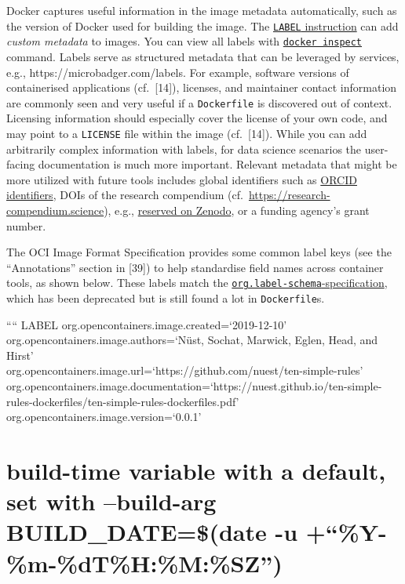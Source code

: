 \documentclass[10pt,letterpaper]{article}
\begin{document}
Docker captures useful information in the image metadata automatically,
such as the version of Docker used for building the image. The
\href{https://docs.docker.com/engine/reference/builder/\#label}{\texttt{LABEL}
instruction} can add \emph{custom metadata} to images. You can view all
labels with
\href{https://docs.docker.com/engine/reference/commandline/inspect/}{\texttt{docker\ inspect}}
command. Labels serve as structured metadata that can be leveraged by
services, e.g., https://microbadger.com/labels. For example, software
versions of containerised applications (cf.~{[}14{]}), licenses, and
maintainer contact information are commonly seen and very useful if a
\texttt{Dockerfile} is discovered out of context. Licensing information
should especially cover the license of your own code, and may point to a
\texttt{LICENSE} file within the image (cf.~{[}14{]}). While you can add
arbitrarily complex information with labels, for data science scenarios
the user-facing documentation is much more important. Relevant metadata
that might be more utilized with future tools includes global
identifiers such as \href{https://orcid.org/}{ORCID identifiers}, DOIs
of the research compendium
(cf.~\url{https://research-compendium.science}), e.g.,
\href{https://help.zenodo.org/}{reserved on Zenodo}, or a funding
agency's grant number.

The OCI Image Format Specification provides some common label keys (see
the ``Annotations'' section in {[}39{]}) to help standardise field names
across container tools, as shown below. These labels match the
\href{http://label-schema.org/rc1/}{\texttt{org.label-schema}-specification},
which has been deprecated but is still found a lot in
\texttt{Dockerfile}s.

\footnotesize

```` LABEL org.opencontainers.image.created=`2019-12-10'\\
org.opencontainers.image.authors=`Nüst, Sochat, Marwick, Eglen, Head,
and Hirst'\\
org.opencontainers.image.url=`https://github.com/nuest/ten-simple-rules'\\
org.opencontainers.image.documentation=`https://nuest.github.io/ten-simple-rules-dockerfiles/ten-simple-rules-dockerfiles.pdf'\\
org.opencontainers.image.version=`0.0.1'

\hypertarget{build-time-variable-with-a-default-set-with-build-arg-build_datedate--u-y-m-dthmsz}{%
\section{build-time variable with a default, set with --build-arg
BUILD\_DATE=\$(date -u
+``\%Y-\%m-\%dT\%H:\%M:\%SZ'')}\label{build-time-variable-with-a-default-set-with-build-arg-build_datedate--u-y-m-dthmsz}}
\end{document}

